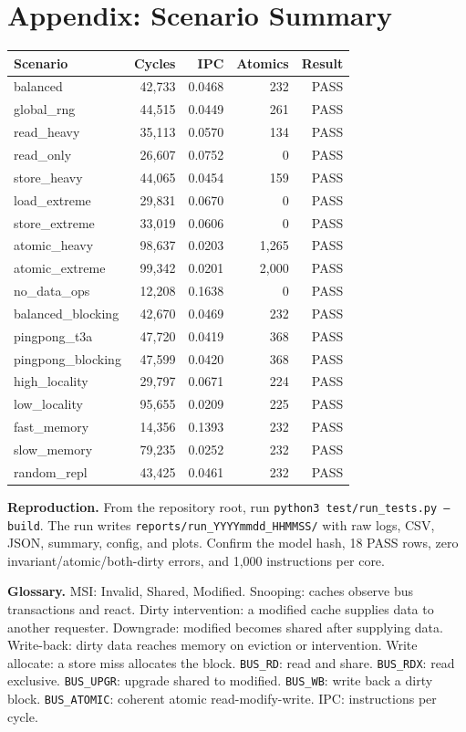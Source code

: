 \documentclass[11pt,a4paper]{article}
\newcommand{\code}[1]{\texttt{\small #1}}
\begin{document}
\section*{Appendix: Scenario Summary}
\begin{center}
\footnotesize
\begin{tabular}{@{}lrrrr@{}}
\toprule
\textbf{Scenario} & \textbf{Cycles} & \textbf{IPC} & \textbf{Atomics} & \textbf{Result} \\
\midrule
balanced & 42,733 & 0.0468 & 232 & PASS \\
global\_rng & 44,515 & 0.0449 & 261 & PASS \\
read\_heavy & 35,113 & 0.0570 & 134 & PASS \\
read\_only & 26,607 & 0.0752 & 0 & PASS \\
store\_heavy & 44,065 & 0.0454 & 159 & PASS \\
load\_extreme & 29,831 & 0.0670 & 0 & PASS \\
store\_extreme & 33,019 & 0.0606 & 0 & PASS \\
atomic\_heavy & 98,637 & 0.0203 & 1,265 & PASS \\
atomic\_extreme & 99,342 & 0.0201 & 2,000 & PASS \\
no\_data\_ops & 12,208 & 0.1638 & 0 & PASS \\
balanced\_blocking & 42,670 & 0.0469 & 232 & PASS \\
pingpong\_t3a & 47,720 & 0.0419 & 368 & PASS \\
pingpong\_blocking & 47,599 & 0.0420 & 368 & PASS \\
high\_locality & 29,797 & 0.0671 & 224 & PASS \\
low\_locality & 95,655 & 0.0209 & 225 & PASS \\
fast\_memory & 14,356 & 0.1393 & 232 & PASS \\
slow\_memory & 79,235 & 0.0252 & 232 & PASS \\
random\_repl & 43,425 & 0.0461 & 232 & PASS \\
\bottomrule
\end{tabular}
\end{center}

\textbf{Reproduction.} From the repository root, run
\code{python3 test/run\_tests.py --build}. The run writes \code{reports/run\_YYYYmmdd\_HHMMSS/}
with raw logs, CSV, JSON, summary, config, and plots. Confirm the model hash, 18 PASS
rows, zero invariant/atomic/both-dirty errors, and 1,000 instructions per core.

\vspace{2pt}
\textbf{Glossary.} MSI: Invalid, Shared, Modified. Snooping: caches observe bus
transactions and react. Dirty intervention: a modified cache supplies data to another
requester. Downgrade: modified becomes shared after supplying data. Write-back: dirty data
reaches memory on eviction or intervention. Write allocate: a store miss allocates the
block. \code{BUS\_RD}: read and share. \code{BUS\_RDX}: read exclusive. \code{BUS\_UPGR}:
upgrade shared to modified. \code{BUS\_WB}: write back a dirty block. \code{BUS\_ATOMIC}:
coherent atomic read-modify-write. IPC: instructions per cycle.
\end{document}

